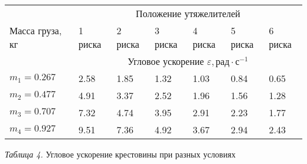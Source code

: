 \begin{center}
    \begin{tabular}{|p{2.5cm}|p{1.5cm}|p{1.5cm}|p{1.5cm}|p{1.5cm}|p{1.5cm}|p{1.5cm}|}
        \hline
        \multirow{3}{2.5cm}{Масса груза, кг} & \multicolumn{6}{c|}{Положение утяжелителей} \\
        \cline{2-7}
        & 1 риска       & 2 риска & 3 риска & 4 риска & 5 риска & 6 риска \\
        \cline{2-7}
        & \multicolumn{6}{c|}{Угловое ускорение $\varepsilon, \text{рад} \cdot \text{с}^{-1}$} \\
        \hline
        $m_1 = 0.267$ &   2.58    &   1.85    &    1.32   &    1.03   &    0.84   &   0.65    \\
        \hline
        $m_2 = 0.477$ &   4.91    &   3.37    &    2.52   &    1.96   &    1.56   &   1.28    \\
        \hline
        $m_3 = 0.707$ &   7.32    &   4.74    &    3.95   &    2.91   &    2.23   &   1.77    \\
        \hline
        $m_4 = 0.927$ &   9.51    &   7.36    &    4.92   &    3.67   &    2.94   &   2.43    \\
        \hline

    \end{tabular}

    \smallvspace

    \textit{Таблица 4.} Угловое ускорение крестовины при разных условиях
\end{center}
